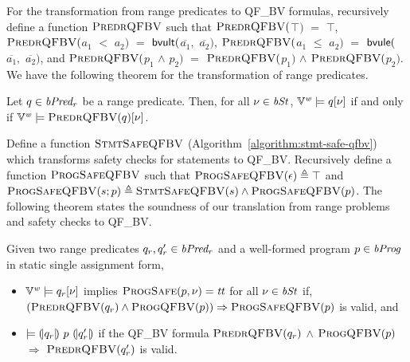 For the transformation from range predicates to QF\_BV formulas, recursively define a function $\textsc{PredrQFBV}$ such that $\textsc{PredrQFBV}($$\top)$ $=$ $\top$, $\textsc{PredrQFBV}($$a_1$ $<$ $a_2)$ $=$ $\mbox{\textsf{bvult}}($$\overline{a_1},$ $\overline{a_2})$, $\textsc{PredrQFBV}($$a_1$ $\leq$ $a_2)$ $=$ $\mbox{\textsf{bvule}}($$\overline{a_1},$ $\overline{a_2})$, and $\textsc{PredrQFBV}($$p_1$ $\wedge$ $p_2)$ $=$ $\textsc{PredrQFBV}($$p_1)$ $\wedge$ $\textsc{PredrQFBV}($$p_2)$.
We have the following theorem for the transformation of range predicates.

\begin{theorem}
Let $q \in \mathit{bPred_r}$ be a range predicate.
Then, for all $\nu \in \mathit{bSt}$, $\mathbb{V}^{\mathit{w}} \models q[\nu]$ if and only if $\mathbb{V}^{\mathit{w}} \models \textsc{PredrQFBV}(q)[\nu]$.
\end{theorem}

Define a function $\textsc{StmtSafeQFBV}$ (Algorithm~\ref{algorithm:stmt-safe-qfbv}) which transforms safety checks for statements to QF\_BV.
Recursively define a function $\textsc{ProgSafeQFBV}$ such that $\textsc{ProgSafeQFBV}(\epsilon) \triangleq \top$ and $\textsc{ProgSafeQFBV}(s; p) \triangleq \textsc{StmtSafeQFBV}(s) \wedge \textsc{ProgSafeQFBV}(p)$.
The following theorem states the soundness of our translation from range problems and safety checks to QF\_BV.

\begin{theorem}
Given two range predicates $q_r, q_r' \in \mathit{bPred_r}$ and a well-formed program $p \in \mathit{bProg}$ in static single assignment form,
\begin{itemize}
\item $\mathbb{V}^{\mathit{w}} \models q_r[\nu]$ implies $\textsc{ProgSafe}(p, \nu) = \mathit{tt}$ for all $\nu \in \mathit{bSt}$ if, $(\textsc{PredrQFBV}(q_r) \wedge \textsc{ProgQFBV}(p)) \Rightarrow \textsc{ProgSafeQFBV}(p)$ is valid, and
\item $\models {(\!|}{q_r}{|\!)}~{p}~{(\!|}{q_r'}{|\!)}$ if the QF\_BV formula $\textsc{PredrQFBV}(q_r)$ $\wedge$ $\textsc{ProgQFBV}(p)$ $\Rightarrow$ $\textsc{PredrQFBV}(q_r')$ is valid.
\end{itemize}
\label{theorem:to-qfbv}
\end{theorem}


